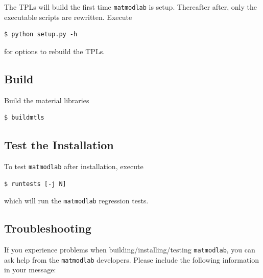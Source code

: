 \documentclass[pdf,ps2pdf,12pt,report,strict]{SANDreport/SANDreport}
\newcommand{\mml}{\texttt{matmodlab}}
\begin{document}
The TPLs will build the first time \mml{} is setup.
Thereafter after, only the executable scripts are rewritten.  Execute

\begin{verbatim}
$ python setup.py -h
\end{verbatim}
for options to rebuild the TPLs.

\subsection{Build}
Build the material libraries
\begin{verbatim}
$ buildmtls
\end{verbatim}

\subsection{Test the Installation}
To test \mml{} after installation, execute

\begin{verbatim}
$ runtests [-j N]
\end{verbatim}
%
which will run the \mml{} regression tests.

\subsection{Troubleshooting}
If you experience problems when building/installing/testing \mml{}, you can
ask help from the \mml{} developers. Please include the following information
in your message:
\end{document}
